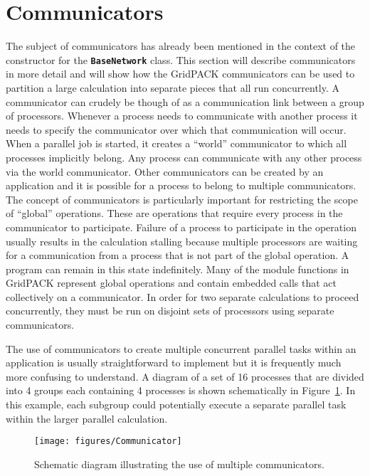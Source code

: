 \section{Communicators}\label{communicator}

The subject of communicators has already been mentioned in the context of the constructor for the \texttt{\textbf{BaseNetwork}} class. This section will describe communicators in more detail and will show how the GridPACK communicators can be used to partition a large calculation into separate pieces that all run concurrently. A communicator can crudely be though of as a communication link between a group of processors. Whenever a process needs to communicate with another process it needs to specify the communicator over which that communication will occur. When a parallel job is started, it creates a ``world'' communicator to which all processes implicitly belong. Any process can communicate with any other process via the world communicator. Other communicators can be created by an application and it is possible for a process to belong to multiple communicators. The concept of communicators is particularly important for restricting the scope of ``global'' operations. These are operations that require every process in the communicator to participate. Failure of a process to participate in the operation usually results in the calculation stalling because multiple processors are waiting for a communication from a process that is not part of the global operation. A program can remain in this state indefinitely. Many of the module functions in GridPACK represent global operations and contain embedded calls that act collectively on a communicator. In order for two separate calculations to proceed concurrently, they must be run on disjoint sets of processors using separate communicators.

The use of communicators to create multiple concurrent parallel tasks within an
application is usually straightforward to implement but it is frequently much
more confusing to understand. A diagram of a set of 16 processes that are
divided into 4 groups each containing 4 processes is shown schematically in
Figure~\ref{fig:communicator}. In this example, each subgroup could potentially execute a separate parallel task within the larger parallel calculation.


\begin{figure}
  \centering
    \texttt{[image: figures/Communicator]}
  \caption{Schematic diagram illustrating the use of multiple communicators.}
  \label{fig:communicator}
\end{figure}


